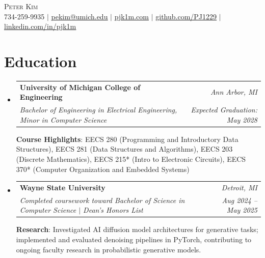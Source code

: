 \documentclass[letterpaper,11pt]{article}
\newcommand{\resumeSubheading}[4]{
  \vspace{-2pt}\item
    \begin{tabularx}{0.97\textwidth}[t]{>{\raggedright\arraybackslash}X r}
      \textbf{#1} & \textit{\small #2} \\
      \textit{\small#3} & \textit{\small #4} \\
    \end{tabularx}\vspace{-7pt}
}
\newcommand{\resumeSubHeadingListStart}{\begin{itemize}[leftmargin=0.15in, label={}]}
\newcommand{\resumeSubHeadingListEnd}{\end{itemize}}
\begin{document}

\begin{center}
    {\Huge \scshape Peter Kim} \\ \vspace{1pt}
    \small 734-259-9935 $|$ \href{mailto:pekim@umich.edu}{\underline{pekim@umich.edu}} $|$ 
    \href{https://pjk1m.com/}{\underline{pjk1m.com}} $|$
    \href{https://github.com/PJ1229}{\underline{github.com/PJ1229}} $|$
    \href{https://linkedin.com/in/pjk1m/}{\underline{linkedin.com/in/pjk1m}}
\end{center}


\section{Education}
  \resumeSubHeadingListStart
    \resumeSubheading
      {University of Michigan College of Engineering}{Ann Arbor, MI}
      {Bachelor of Engineering in Electrical Engineering, Minor in Computer Science}{Expected Graduation: May 2028}
      \vspace{3pt}

      {\small \textbf{Course Highlights}: EECS 280 (Programming and Introductory Data Structures), EECS 281 (Data Structures and Algorithms), EECS 203 (Discrete Mathematics), EECS 215* (Intro to Electronic Circuits), EECS 370* (Computer Organization and Embedded Systems)\par}
      \vspace{-1pt}
    \resumeSubheading
      {Wayne State University}{Detroit, MI}
      {Completed coursework toward Bachelor of Science in Computer Science $|$ Dean's Honors List}{Aug 2024 -- May 2025}
      \vspace{3pt}
      
      {\small \textbf{Research}: Investigated AI diffusion model architectures for generative tasks; implemented and evaluated denoising pipelines in PyTorch, contributing to ongoing faculty research in probabilistic generative models.\par}
      \vspace{-1pt}
  \resumeSubHeadingListEnd
\end{document}
